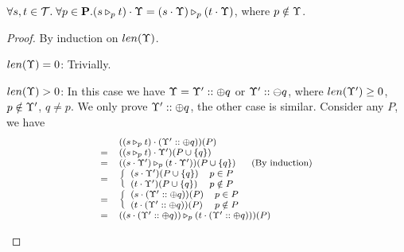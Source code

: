{{{\begin{lemma}\label{lem:tracemerge}
$\forall s,t\in\Tcal.\; \forall p\in\PS.  (\omerge{p}{s}{t})\cdot \trace = \omerge{p}{(s\cdot\trace)}{(t\cdot\trace)} $, where $p\notin \trace$.
\end{lemma}
\begin{proof}
By induction on $\tlength{\trace}$.
\begin{ProofEnumDesc}
\item[$\tlength{\trace} = 0$:] Trivially.
\item[$\tlength{\trace} > 0$:] In this case we have $\trace = \trace'::\tplus{q}$ or $\trace'::\tminus{q}$, where $\tlength{\trace'} \geq 0$, $p\notin \trace' $, $q\neq p$. We only prove $\trace'::\tplus{q}$, the other case is similar. Consider any $P$, we have
$$\myeqsize
\begin{array}{rlll}\myeqsize
&&((\omerge{p}{s}{t})\cdot (\trace'::\tplus{q}))(P)&\\
&= & ((\omerge{p}{s}{t})\cdot\trace')(P\cup\{q\}) & \\
 &= & (\omerge{p}{(s\cdot\trace')}{(t\cdot\trace')})(P\cup\{q\})~~~~~(\textrm{By induction}) & \\
& = & \left \{ \begin{array}{ll} (s\cdot\trace')(P\cup \{q\})  & p\in P \\ (t\cdot\trace')(P\cup \{q\})  & p\notin P \end{array} \right.&\\
& = & \left \{ \begin{array}{ll} (s\cdot(\trace'::\tplus{q}))(P)  & p\in P \\ (t\cdot(\trace'::\tplus{q}))(P)  & p\notin P \end{array} \right.&\\
&= & (\omerge{p}{(s\cdot(\trace'::\tplus{q}))}{(t\cdot(\trace'::\tplus{q}))})(P) &\\
\end{array}
$$
\end{ProofEnumDesc}
\end{proof}


}}}
